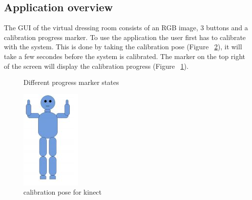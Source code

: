 \documentclass[twocolumn,a4paper]{article}
\begin{document}
\subsection{Application overview}
\label{sec:application_overview}
The GUI of the virtual dressing room consists of an RGB image, 3 buttons and a calibration progress marker. To use the application the user first has to calibrate with the system. This is done by taking the calibration pose (Figure ~\ref{fig:calibrationPose}), it will take a few secondes before the system is calibrated. The marker on the top right of the screen will display the calibration progress (Figure ~\ref{fig:progressmarker}).
\begin{figure}[h!]
\centering
	\caption{Different progress marker states} 
	\label{fig:progressmarker}
\end{figure}

\begin{figure}
\centering
\includegraphics[scale=0.5]{calibrationPose.png} 
\caption{calibration pose for kinect}
\label{fig:calibrationPose}
\end{figure}
\end{document}
